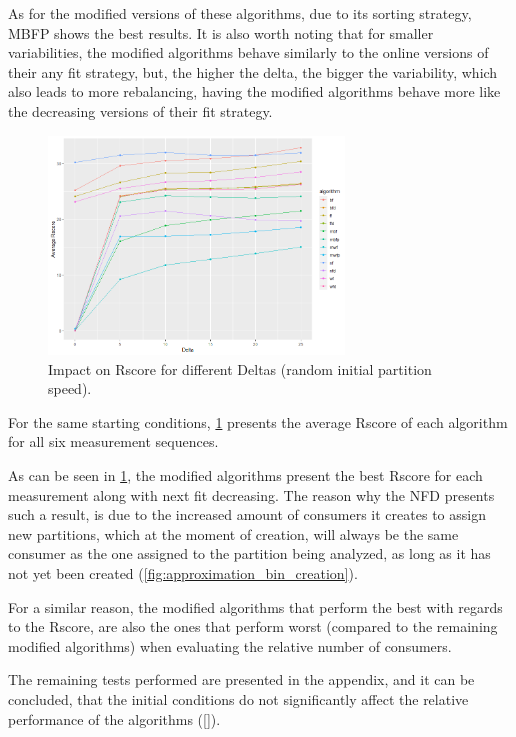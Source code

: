 As for the modified versions of these algorithms, due to its sorting strategy,
MBFP shows the best results. It is also worth noting that for smaller
variabilities, the modified algorithms behave similarly to the online versions
of their any fit strategy, but, the higher the delta, the bigger the
variability, which also leads to more rebalancing, having the modified
algorithms behave more like the decreasing versions of their fit strategy.

\begin{figure}[H] 
    \centering
    \includegraphics[width=0.7\textwidth]{images/controller/Rscore.png}
    \caption{
        Impact on Rscore for different Deltas (random initial partition speed).
    } 
    \label{fig:rscore} 
\end{figure}

For the same starting conditions, \ref{fig:rscore} presents the average Rscore
of each algorithm for all six measurement sequences.

As can be seen in \ref{fig:rscore}, the modified algorithms present the best
Rscore for each measurement along with next fit decreasing. The reason why the
NFD presents such a result, is due to the increased amount of consumers it
creates to assign new partitions, which at the moment of creation, will always
be the same consumer as the one assigned to the partition being analyzed, as
long as it has not yet been created (\ref{fig:approximation_bin_creation}).

For a similar reason, the modified algorithms that perform the best with regards
to the Rscore, are also the ones that perform worst (compared to the remaining
modified algorithms) when evaluating the relative number of consumers.

The remaining tests performed are presented in the appendix, and it can be
concluded, that the initial conditions do not significantly affect the relative
performance of the algorithms (\ref{}).

